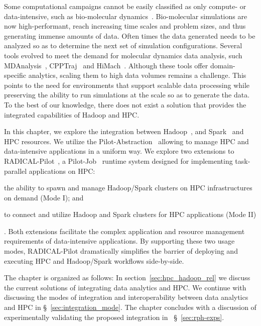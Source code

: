 Some computational campaigns cannot be easily classified as only compute- or data-intensive, such as bio-molecular dynamics~\cite{dror2012biomolecular}.
Bio-molecular simulations are now high-performant, reach increasing time scales and problem sizes, and thus generating immense amounts of data.
Often times the data generated needs to be analyzed so as to determine the next set of simulation configurations.
Several tools evolved to meet the demand for molecular dynamics data analysis, such MDAnalysis~\cite{michaud2011mdanalysis,gowers2016mdanalysis}, CPPTraj~\cite{roe2013ptraj} and HiMach~\cite{tiankai2008scalable}.
Although these tools offer domain-specific analytics, scaling them to high data volumes remains a challenge.
This points to the need for environments that support scalable data processing while preserving the ability to run simulations at the scale so as to generate the data.
To the best of our knowledge, there does not exist a solution that provides the integrated capabilities of Hadoop and HPC.

In this chapter, we explore the integration between Hadoop~\cite{hadoop}, and Spark~\cite{zaharia2010spark} and HPC resources.
We utilize the Pilot-Abstraction~\cite{luckow2012pstar} allowing to manage HPC and data-intensive applications in a uniform way.
We explore two extensions to RADICAL-Pilot~\cite{merzky2018design}, a Pilot-Job~\cite{luckow2012pstar} runtime system designed for implementing task-parallel applications on HPC: 
\begin{inparaenum}[1)]
    \item the ability to spawn and manage Hadoop/Spark clusters on HPC infrastructures on demand (Mode I); and
    \item to connect and utilize Hadoop and Spark clusters for HPC applications (Mode II)
\end{inparaenum}.
Both extensions facilitate the complex application and resource management requirements of data-intensive applications.
By supporting these two usage modes, RADICAL-Pilot dramatically simplifies the barrier of deploying and executing HPC and Hadoop/Spark workflows side-by-side.

The chapter is organized as follows: In section~\ref{sec:hpc_hadoop_rel} we discuss the current solutions of integrating data analytics and HPC.
We continue with discussing the modes of integration and interoperability between data analytics and HPC in \S~\ref{sec:integration_mode}.
The chapter concludes with a discussion of experimentally validating the proposed integration in ~\S~\ref{sec:rph-exps}.

